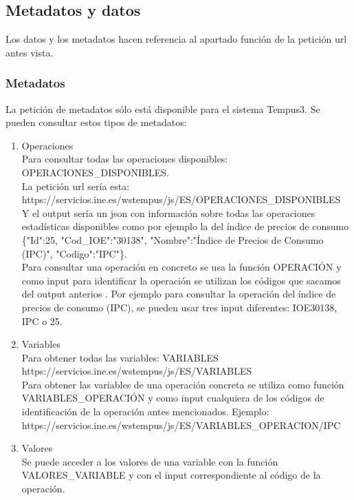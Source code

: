 \subsection{Metadatos y datos}
Los datos y los metadatos hacen referencia al apartado {función} de la petición url antes vista.
\subsubsection{Metadatos}
La petición de metadatos sólo está disponible para el sistema Tempus3. Se pueden consultar estos tipos de metadatos:
\begin{enumerate}
    \item Operaciones\\ Para consultar todas las operaciones disponibles:\\ OPERACIONES\_DISPONIBLES.\\ La petición url sería esta:\\ https://servicios.ine.es/wstempus/js/ES/OPERACIONES\_DISPONIBLES\\ Y el output sería un json con información sobre todas las operaciones estadísticas disponibles como por ejemplo la del índice de precios de consumo\\
    \{"Id":25, "Cod\_IOE":"30138", "Nombre":"Índice de Precios de Consumo (IPC)", "Codigo":"IPC"\}.\\
    Para consultar una operación en concreto se usa la función OPERACIÓN y como input para identificar la operación se utilizan los códigos que sacamos del output anterios . Por ejemplo para consultar la operación del índice de precios de consumo (IPC), se pueden usar tres input diferentes:  IOE30138, IPC o 25.
    \item Variables\\
    Para obtener todas las variables: VARIABLES\\ https://servicios.ine.es/wstempus/js/ES/VARIABLES\\
    Para obtener las variables de una operación concreta se utiliza como función VARIABLES\_OPERACIÓN y como input cualquiera de los códigos de identificación de la operación antes mencionados. Ejemplo: https://servicios.ine.es/wstempus/js/ES/VARIABLES\_OPERACION/IPC \\
    \item Valores\\
    Se puede acceder a los valores de una variable con la función VALORES\_VARIABLE y con el input correspondiente al código de la operación.\\

\end{enumerate}
